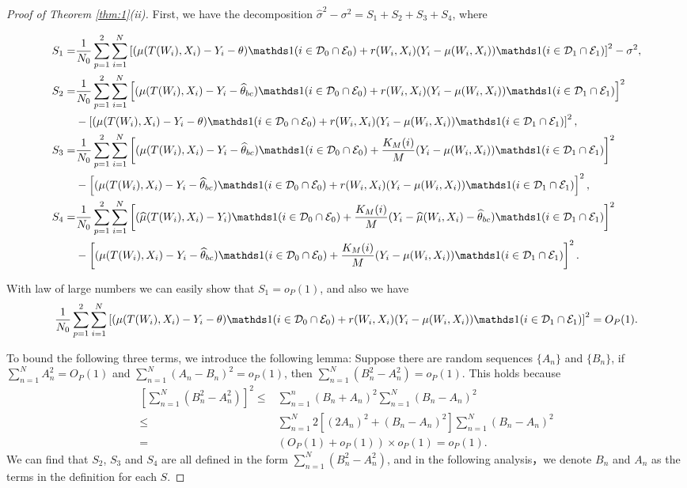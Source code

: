\documentclass[11pt]{article}
\numberwithin{equation}{section}
\theoremstyle{definition}
\begin{document}
\begin{proof}[Proof of Theorem \ref{thm:1}(ii)]
First, we have the decomposition $\hat{\sigma}^2 - \sigma^2 = S_1 + S_2 + S_3 + S_4$, where

\begin{align*}
S_1=&\frac{1}{N_0}\sum_{p=1}^2\sum_{i=1}^N\left[(\mu(T(W_i),X_i)-Y_i-\theta)\ind(i \in \mathcal{D}_0\cap\mathcal{E}_0)+r(W_i,X_i)(Y_{i}-\mu(W_{i},X_{i}))\ind(i \in \mathcal{D}_1\cap\mathcal{E}_1)\right]^2-\sigma^2,\\
S_2=&\frac{1}{N_0}\sum_{p=1}^2\sum_{i=1}^N\left[(\mu(T(W_i),X_i)-Y_i-\widehat{\theta}_{bc})\ind(i \in \mathcal{D}_0\cap\mathcal{E}_0)+r(W_i,X_i)(Y_{i}-\mu(W_{i},X_{i}))\ind(i \in \mathcal{D}_1\cap\mathcal{E}_1)\right]^2\\
&-\left[(\mu(T(W_i),X_i)-Y_i-\theta)\ind(i \in \mathcal{D}_0\cap\mathcal{E}_0)+r(W_i,X_i)(Y_{i}-\mu(W_{i},X_{i}))\ind(i \in \mathcal{D}_1\cap\mathcal{E}_1)\right]^2,\\
S_3=&\frac{1}{N_0}\sum_{p=1}^2\sum_{i=1}^N\left[(\mu(T(W_i),X_i)-Y_i-\widehat{\theta}_{bc})\ind(i \in \mathcal{D}_0\cap\mathcal{E}_0)+\frac{K_M(i)}{M}(Y_{i}-\mu(W_{i},X_{i}))\ind(i \in \mathcal{D}_1\cap\mathcal{E}_1)\right]^2\\
&-\left[(\mu(T(W_i),X_i)-Y_i-\widehat{\theta}_{bc})\ind(i \in \mathcal{D}_0\cap\mathcal{E}_0)+r(W_i,X_i)(Y_{i}-\mu(W_{i},X_{i}))\ind(i \in \mathcal{D}_1\cap\mathcal{E}_1)\right]^2,\\
S_4=&\frac{1}{N_0}\sum_{p=1}^2\sum_{i=1}^N\left[(\widehat{\mu}(T(W_i),X_i)-Y_i)\ind(i \in \mathcal{D}_0\cap\mathcal{E}_0)+\frac{K_M(i)}{M}(Y_{i}-\widehat{\mu}(W_{i},X_{i})-\widehat{\theta}_{bc})\ind(i \in \mathcal{D}_1\cap\mathcal{E}_1)\right]^2\\
&-\left[(\mu(T(W_i),X_i)-Y_i-\widehat{\theta}_{bc})\ind(i \in \mathcal{D}_0\cap\mathcal{E}_0)+\frac{K_M(i)}{M}(Y_{i}-\mu(W_{i},X_{i}))\ind(i \in \mathcal{D}_1\cap\mathcal{E}_1)\right]^2.
\end{align*}

With law of large numbers we can easily show that $S_1=o_P(1)$, and also we have
\[\frac{1}{N_0}\sum_{p=1}^2\sum_{i=1}^N\left[(\mu(T(W_i),X_i)-Y_i-\theta)\ind(i \in \mathcal{D}_0\cap\mathcal{E}_0)+r(W_i,X_i)(Y_{i}-\mu(W_{i},X_{i}))\ind(i \in \mathcal{D}_1\cap\mathcal{E}_1)\right]^2=O_P(1).\]

To bound the following three terms, we introduce the following lemma: Suppose there are random sequences $\{A_n\}$ and $\{B_n\}$, if \(\sum_{n=1}^NA_n^2=O_P(1)\) and \(\sum_{n=1}^N(A_n-B_n)^2=o_P(1)\), then \(\sum_{n=1}^N(B_n^2-A_n^2)=o_P(1).\) This holds because 
\begin{align*}
    \left[\sum_{n=1}^N(B_n^2-A_n^2)\right]^2\leq& \sum_{n=1}^n(B_n+A_n)^2\sum_{n=1}^N(B_n-A_n)^2\\
    \leq& \sum_{n=1}^N2\left[(2A_n)^2+(B_n-A_n)^2\right]\sum_{n=1}^N(B_n-A_n)^2\\
    =&(O_P(1)+o_P(1))\times o_P(1)=o_P(1).
\end{align*}
We can find that $S_2$, $S_3$ and $S_4$ are all defined in the form $\sum_{n=1}^N(B_n^2-A_n^2)$, and in the following analysis，we denote $B_n$ and $A_n$ as the terms in the definition for each $S$.


\end{proof}
\end{document}
